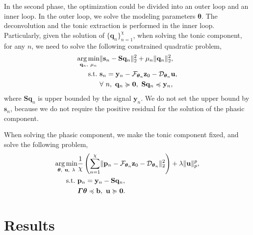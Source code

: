 \documentclass[10pt,conference]{ieeeconf}
\DeclareMathOperator*{\argmin}{arg\,min}
\begin{document}
In the second phase, the optimization could be divided into an outer loop and an inner loop. In the outer loop, we solve the modeling parameters $\boldsymbol{\theta}$. The deconvolution and the tonic extraction is performed in the inner loop. Particularly, given the solution of $\{\mathbf{q}_n\}_{n=1}^{\chi}$, when solving the tonic component, for any $n$, we need to solve the following constrained quadratic problem,
\begin{subequations} \label{fml:the:second-tonic}
  \renewcommand{\theequation}
  {\theparentequation-\arabic{equation}}
  \begin{align}
    \argmin\limits_{\mathbf{q}_n,~\mu_n} & \lVert \mathbf{s}_n - \mathbf{S} \mathbf{q}_n \rVert^2_2 + \mu_n \lVert \mathbf{q}_n \rVert_2^2, \\
    \mathrm{s.t.}~& \mathbf{s}_n = \mathbf{y}_n - \mathcal{F}_{\boldsymbol{\theta}_n} \mathbf{z}_{0} - \mathcal{D}_{\boldsymbol{\theta}_n} \mathbf{u}, \label{fml:the:second-tonic-obj}\\
    & \forall~n,~\mathbf{q}_n \succcurlyeq \mathbf{0},~\mathbf{S}\mathbf{q}_n \preccurlyeq \mathbf{y}_n,
  \end{align}
\end{subequations}
%
where $\mathbf{S}\mathbf{q}_n$ is upper bounded by the signal $\mathbf{y}_n$. We do not set the upper bound by $\mathbf{s}_n$, because we do not require the positive residual for the solution of the phasic component.

When solving the phasic component, we make the tonic component fixed, and solve the following problem,
\begin{subequations} \label{fml:the:second-phasic}
  \renewcommand{\theequation}
  {\theparentequation-\arabic{equation}}
  \begin{align}
  \argmin\limits_{\boldsymbol{\theta},~\mathbf{u},~\lambda} & \frac{1}{\chi}  \left( \sum_{n=1}^{\chi} \lVert \mathbf{p}_n - \mathcal{F}_{\boldsymbol{\theta}_n} \mathbf{z}_{0} - \mathcal{D}_{\boldsymbol{\theta}_n} \rVert^2_2 \right) + \lambda \lVert \mathbf{u} \rVert_p^p, \\
  \mathrm{s.t.}~& \mathbf{p}_n = \mathbf{y}_n -  \mathbf{S} \mathbf{q}_n, \\
  & \boldsymbol{\Gamma} \boldsymbol{\theta} \preccurlyeq \mathbf{b},~ \mathbf{u} \succcurlyeq \mathbf{0}.
  \end{align}
\end{subequations}

\section{Results}
\end{document}
